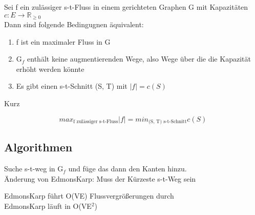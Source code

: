 \documentclass[14pt]{article}
\begin{document}
\begin{definition}
    Sei f ein zulässiger s-t-Fluss in einem gerichteten Graphen
    G mit Kapazitäten $c : E \rightarrow \mathbb{R}_{\geq 0}$ \\
    Dann sind folgende Bedingugnen äquivalent:
    \begin{enumerate}
        \item f ist ein maximaler Fluss in G
        \item G$_f$ enthält keine augmentierenden Wege, also Wege über
            die die Kapazität erhöht werden könnte
        \item Es gibt einen s-t-Schnitt (S, T) mit $|f| = c(S)$
    \end{enumerate}
    Kurz \\
    \begin{centering}
        \[
            max_{\text{f zulässiger s-t-Fluss}} |f|
            = min_{\text{(S, T) s-t-Schnitt}} c(S)
        \]
    \end{centering}
\end{definition}

\subsection{Algorithmen}
\begin{definition}
    Suche s-t-weg in G$_f$ und füge das dann den
    Kanten hinzu. \\
    Änderung von EdmonsKarp: Muss der Kürzeste s-t-Weg sein
\end{definition}
EdmonsKarp führt O(VE) Flussvergrößerungen durch \\
EdmonsKarp läuft in O(VE$^2$)
\end{document}
